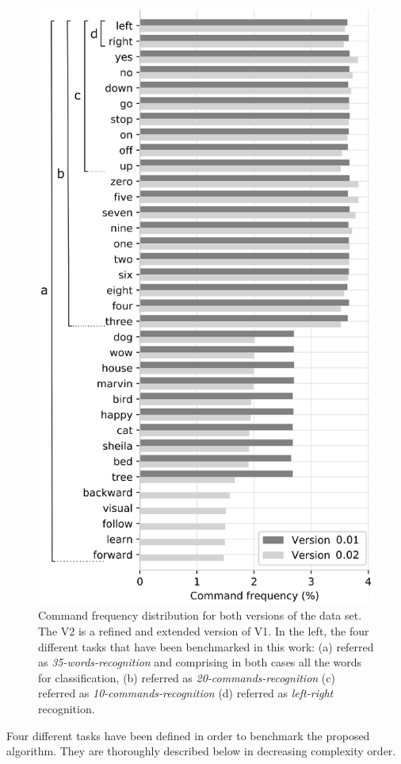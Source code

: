 \documentclass[review]{elsarticle}
\begin{document}
\begin{figure}[ht]
	\centering
	\includegraphics[width=0.45\linewidth]{img/freqdist_data}
	\caption{Command frequency distribution for both versions of the data set. The V2 is a refined and extended version of V1. In the left, the four different tasks that have been benchmarked in this work: (a) referred as \textit{35-words-recognition} and comprising in both cases all the words for classification, (b) referred as \textit{20-commands-recognition}  (c) referred as \textit{10-commands-recognition} (d) referred as \textit{left-right} recognition.}
	\label{fig:freqdistdata}
\end{figure}

Four different tasks have been defined in order to benchmark the proposed algorithm. They are thoroughly described below in decreasing complexity order.
\end{document}
